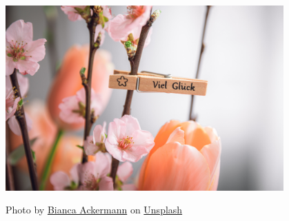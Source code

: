 \documentclass{beamer}
\begin{document}
\begin{frame}

\begin{center}
\includegraphics[width=0.8\textwidth]{bianca-ackermann-5eycrSH0USA-unsplash.jpg}
\end{center}

\tiny{
Photo by \href{https://unsplash.com/ko/@biancablah?utm_source=unsplash&utm_medium=referral&utm_content=creditCopyText}{Bianca Ackermann} on \href{https://unsplash.com/photos/5eycrSH0USA?utm_source=unsplash&utm_medium=referral&utm_content=creditCopyText}{Unsplash}
}
  
\end{frame}
\end{document}
